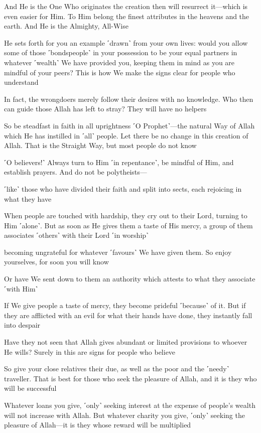 And He is the One Who originates the creation then will resurrect it—which is even easier for Him. To Him belong the finest attributes in the heavens and the earth. And He is the Almighty, All-Wise

He sets forth for you an example ˹drawn˺ from your own lives: would you allow some of those ˹bondspeople˺ in your possession to be your equal partners in whatever ˹wealth˺ We have provided you, keeping them in mind as you are mindful of your peers? This is how We make the signs clear for people who understand

In fact, the wrongdoers merely follow their desires with no knowledge. Who then can guide those Allah has left to stray? They will have no helpers

So be steadfast in faith in all uprightness ˹O Prophet˺—the natural Way of Allah which He has instilled in ˹all˺ people. Let there be no change in this creation of Allah. That is the Straight Way, but most people do not know

˹O believers!˺ Always turn to Him ˹in repentance˺, be mindful of Him, and establish prayers. And do not be polytheists—

˹like˺ those who have divided their faith and split into sects, each rejoicing in what they have

When people are touched with hardship, they cry out to their Lord, turning to Him ˹alone˺. But as soon as He gives them a taste of His mercy, a group of them associates ˹others˺ with their Lord ˹in worship˺

becoming ungrateful for whatever ˹favours˺ We have given them. So enjoy yourselves, for soon you will know

Or have We sent down to them an authority which attests to what they associate ˹with Him˺

If We give people a taste of mercy, they become prideful ˹because˺ of it. But if they are afflicted with an evil for what their hands have done, they instantly fall into despair

Have they not seen that Allah gives abundant or limited provisions to whoever He wills? Surely in this are signs for people who believe

So give your close relatives their due, as well as the poor and the ˹needy˺ traveller. That is best for those who seek the pleasure of Allah, and it is they who will be successful

Whatever loans you give, ˹only˺ seeking interest at the expense of people’s wealth will not increase with Allah. But whatever charity you give, ˹only˺ seeking the pleasure of Allah—it is they whose reward will be multiplied

